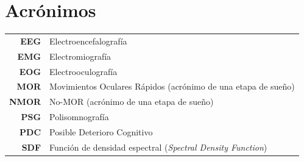 \documentclass[12pt,a4paper]{mitthesis}
\begin{document}


\chapter*{Acr\'onimos}

\begin{tabular}{rl}
\textbf{EEG} & Electroencefalograf\'ia
\\
\textbf{EMG} & Electromiograf\'ia
\\
\textbf{EOG} & Electrooculograf\'ia
\\
\textbf{MOR} & Movimientos Oculares R\'apidos (acr\'onimo de una etapa de sue\~no)
\\
\textbf{NMOR}& No-MOR (acr\'onimo de una etapa de sue\~no)
\\
\textbf{PSG} & Polisomnograf\'ia
\\
\textbf{PDC} & Posible Deterioro Cognitivo
\\
\textbf{SDF} & Funci\'on de densidad espectral (\textit{Spectral Density Function})
\end{tabular}

\newpage


\thispagestyle{empty}

\tableofcontents
\newpage

\end{document}
